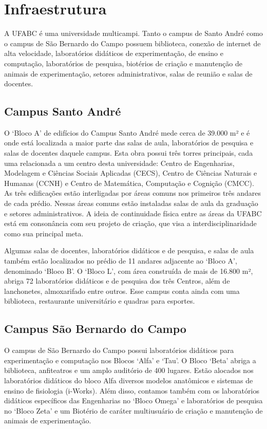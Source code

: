 \section{Infraestrutura}

A UFABC é uma universidade multicampi.
Tanto o campus de Santo André como o campus de São Bernardo do Campo possuem
biblioteca, conexão de internet de alta velocidade, laboratórios didáticos de
experimentação, de ensino e computação, laboratórios de pesquisa, biotérios de
criação e manutenção de animais de experimentação, setores administrativos,
salas de reunião e salas de docentes.

\subsection{Campus Santo André}

O `Bloco A' de edifícios do Campus Santo André mede cerca de 39.000 m² e é
onde está localizada a maior parte das salas de aula, laboratórios de pesquisa
e salas de docentes daquele campus.
Esta obra possui três torres principais, cada uma relacionada a um centro desta
universidade: Centro de Engenharias, Modelagem e Ciências Sociais Aplicadas
(CECS), Centro de Ciências Naturais e Humanas (CCNH) e Centro de Matemática,
Computação e Cognição (CMCC).
As três edificações estão interligadas por áreas comuns nos primeiros três
andares de cada prédio.
Nessas áreas comuns estão instaladas salas de aula da graduação e setores
administrativos.
A ideia de continuidade física entre as áreas da UFABC está em consonância com
seu projeto de criação, que visa a interdisciplinaridade como sua principal
meta.

Algumas salas de docentes, laboratórios didáticos e de pesquisa, e salas de
aula também estão localizados no prédio de 11 andares adjacente ao `Bloco A',
denominado `Bloco B'.
O `Bloco L', com área construída de mais de 16.800 m², abriga 72
laboratórios didáticos e de pesquisa dos três Centros, além de lanchonetes,
almoxarifado entre outros.
Esse campus conta ainda com uma biblioteca, restaurante universitário e quadras
para esportes.

\subsection{Campus São Bernardo do Campo} 

O campus de São Bernardo do Campo possui laboratórios didáticos para
experimentação e computação nos Blocos `Alfa' e `Tau'.
O Bloco `Beta' abriga a biblioteca, anfiteatros e um amplo auditório de 400
lugares.
Estão alocados nos laboratórios didáticos do bloco Alfa diversos modelos
anatômicos e sistemas de ensino de fisiologia (i-Works).
Além disso, contamos também com os laboratórios didáticos específicos das
Engenharias no `Bloco Omega' e laboratórios de pesquisa no `Bloco Zeta' e um
Biotério de caráter multiusuário de criação e manutenção de animais de
experimentação.

